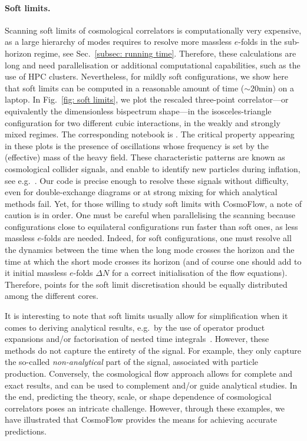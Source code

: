 \documentclass[11pt]{article}
\numberwithin{equation}{section} %
\begin{document}
\paragraph{Soft limits.} Scanning soft limits of cosmological correlators is computationally very expensive, as a large hierarchy of modes requires to resolve more massless $e$-folds in the sub-horizon regime, see Sec.~\ref{subsec: running time}. Therefore, these calculations are long and need parallelisation or additional computational capabilities, such as the use of HPC clusters. Nevertheless, for mildly soft configurations, we show here that soft limits can be computed in a reasonable amount of time ($\sim20$min) on a laptop. In Fig.~\ref{fig: soft limits}, we plot the rescaled three-point correlator---or equivalently the dimensionless bispectrum shape---in the isosceles-triangle configuration for two different cubic interactions, in the weakly and strongly mixed regimes. The corresponding notebook is \href{https://github.com/deniswerth/CosmoFlow/blob/main/CosmoFlow/PhiPsi/KinematicDependence.ipynb}{\faGithub}. The critical property appearing in these plots is the presence of oscillations whose frequency is set by the (effective) mass of the heavy field. These characteristic patterns are known as cosmological collider signals, and enable to identify new particles during inflation, see e.g.~\cite{Chen:2009we, Chen:2009zp, Noumi:2012vr, Arkani-Hamed:2015bza, Werth:2023pfl, Pinol:2023oux}. Our code is precise enough to resolve these signals without difficulty, even for double-exchange diagrams or at strong mixing for which analytical methods fail. Yet, for those willing to study soft limits with \textsf{CosmoFlow}, a note of caution is in order. One must be careful when parallelising the scanning because configurations close to equilateral configurations run faster than soft ones, as less massless $e$-folds are needed. Indeed, for soft configurations, one must resolve all the dynamics between the time when the long mode crosses the horizon and the time at which the short mode crosses its horizon (and of course one should add to it initial massless $e$-folds $\Delta N$ for a correct initialisation of the flow equations). Therefore, points for the soft limit discretisation should be equally distributed among the different cores. 

\vskip 4pt
It is interesting to note that soft limits usually allow for simplification when it comes to deriving analytical results, e.g.~by the use of operator product expansions and/or factorisation of nested time integrals~\cite{Arkani-Hamed:2015bza, Lee:2016vti, Pinol:2021aun, Tong:2021wai, Qin:2022lva, Qin:2023bjk}. However, these methods do not capture the entirety of the signal. For example, they only capture the so-called \textit{non-analytical} part of the signal, associated with particle production. Conversely, the cosmological flow approach allows for complete and exact results, and can be used to complement and/or guide analytical studies. In the end, predicting the theory, scale, or shape dependence of cosmological correlators poses an intricate challenge. However, through these examples, we have illustrated that \textsf{CosmoFlow} provides the means for achieving accurate predictions.
\end{document}
